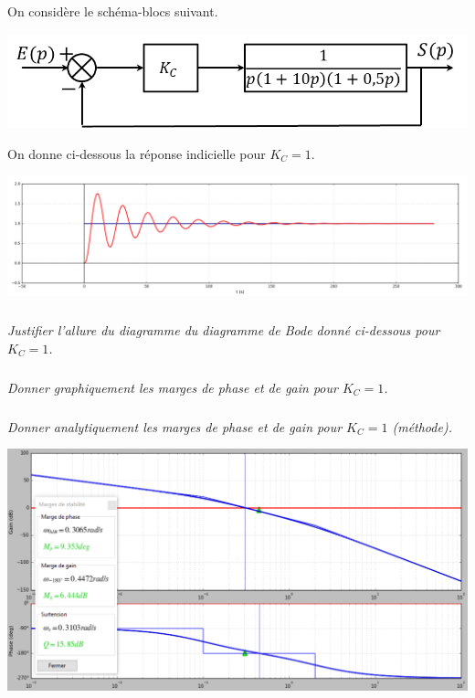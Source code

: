 \documentclass[10pt,fleqn]{article} %
\begin{document}
\def\pathfig{images}

\vspace{4.5cm}
\pagestyle{fancy}
\thispagestyle{plain}

\def\columnseprulecolor{\color{ocre}}
\setlength{\columnseprule}{0.4pt} 

\def\pathfig{images}

\ifprof
\else
\begin{multicols}{2}
\fi

On considère le schéma-blocs suivant. 
\begin{center}
\includegraphics[width=\linewidth]{images/fig_01}
\end{center}

On donne ci-dessous la réponse indicielle pour $K_C=1$.

\begin{center}
\includegraphics[width=\linewidth]{images/fig_02}
\end{center}


\subparagraph{}\textit{Justifier l'allure du diagramme du diagramme de Bode donné ci-dessous pour $K_C=1$.}

\subparagraph{}\textit{Donner graphiquement les marges de phase et de gain pour $K_C=1$.}


\subparagraph{}\textit{Donner analytiquement les marges de phase et de gain pour $K_C=1$ (méthode).}
\ifprof
\begin{center}
\includegraphics[width=\linewidth]{images/cor_01}
\end{center}


\end{multicols}
\end{document}
